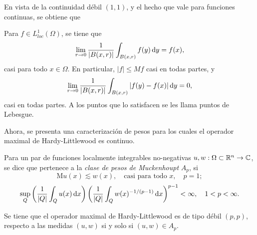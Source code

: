 En vista de la continuidad débil $(1, 1)$, y el hecho que vale para funciones continuas, se obtiene que
\begin{corollary}
	Para $f\in L^1_{loc}(\Omega)$, se tiene que 
	\begin{equation*}
		\lim_{r\to0}\frac{1}{|B(x, r)|} \int_{B(x, r)} f(y) \mathop{}\!\mathrm{d} y = f(x),
	\end{equation*}
	casi para todo $x\in\Omega$.  En particular, $|f|\leq Mf$ casi en todas partes, y
	\begin{equation*}
		\lim_{r\to0}\frac{1}{|B(x, r)|} \int_{B(x, r)} |f(y)-f(x)| \mathop{}\!\mathrm{d} y = 0,
	\end{equation*}
	casi en todas partes. A los puntos que lo satisfacen se les llama puntos de Lebesgue.
\end{corollary}
Ahora, se presenta una caracterización de pesos para los cuales el operador maximal de Hardy-Littlewood es continuo.
\begin{definition}
	Para un par de  funciones localmente integrables no-negativas $u,w:\Omega\subset\mathbb{R}^n\to\mathbb{C}$, se dice que pertenece a la \textit{clase de pesos de Muckenhoupt} $A_p$, si
	\begin{equation*}
		\mathrm{M}u(x) \lesssim w(x), \quad \text{casi para todo }x,\quad p=1;
	\end{equation*}
	\begin{equation*}
		\sup_Q \left(\frac{1}{|Q|}\int_Q u(x)\mathop{}\!\mathrm{d} x \right)\left(\frac{1}{|Q|}\int_Q w(x)^{-1/(p-1)}\mathop{}\!\mathrm{d} x\right)^{p-1} < \infty, \quad 1<p<\infty.
	\end{equation*}
\end{definition}
\begin{theorem}
	Se tiene que el operador maximal de Hardy-Littlewood es de tipo débil $(p,p)$, respecto a las medidas $(u, w)$ si y solo si $(u, w) \in A_p$.
\end{theorem}
